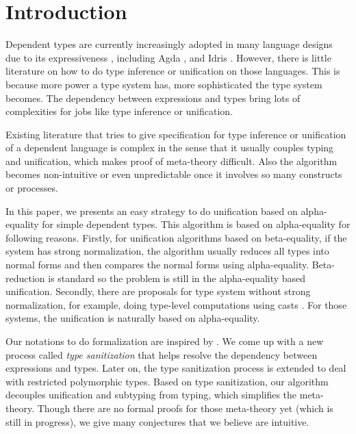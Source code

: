 \section{Introduction}

Dependent types are currently increasingly adopted in many language
designs due to its expressiveness \cite{xi1999dependent, licata2005formulation,
  pasalic2006concoqtion, mckinna2006dependent}, including Agda
\cite{norell2009dependently}, and Idris \cite{brady2013idris}.
However, there is little literature on
how to do type inference or unification on those languages. This is because
more power a type system has, more sophisticated the type system
becomes. The dependency between expressions and types bring lots of complexities
for jobs like type inference or unification.

Existing literature \cite{ziliani2015unification}
that tries to give specification for type inference
or unification of
a dependent language is complex in the sense that it usually couples typing
and unification, which makes proof of meta-theory difficult.
Also the algorithm becomes non-intuitive or even unpredictable once it involves
so many constructs or processes.

In this paper, we presents an easy strategy to do unification based on
alpha-equality for simple dependent
types. This algorithm is based on alpha-equality for following reasons. Firstly,
for unification algorithms based on beta-equality, if the system has strong
normalization, the algorithm usually reduces all types into normal forms and
then compares the normal forms using
alpha-equality. Beta-reduction is standard so the problem is still in the
alpha-equality based unification.
Secondly, there are proposals for type system without strong
normalization, for example, doing type-level computations using casts
\cite{van2013explicit, kimmell2012equational, sjoberg2012irrelevance}
. For
those systems, the unification is naturally based on alpha-equality.

Our notations to do formalization are inspired by \cite{dunfield2013complete}.
We come up with a new
process called \textit{type sanitization} that helps resolve the dependency
between expressions and types. Later on, the type sanitization process is
extended to deal with restricted polymorphic types.
Based on type sanitization, our algorithm
decouples unification and subtyping from typing, which simplifies the
meta-theory. Though there are no formal proofs for those meta-theory yet (which
is still in progress),
we give many conjectures that we believe are intuitive.

